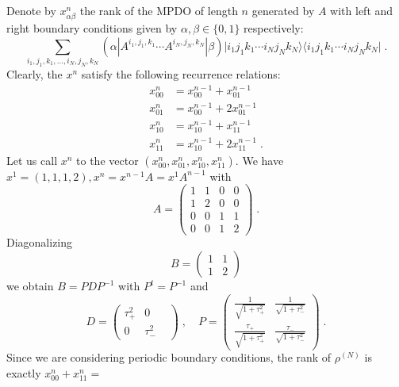 \documentclass{elsarticle}
\newcommand{\be}{\begin{equation}}
\newcommand{\ee}{\end{equation}}
\newcommand{\ket}[1]{\vert#1\rangle}
\newcommand{\bra}[1]{\langle#1\vert}
\begin{document}
Denote by $x^n_{\alpha\beta}$ the rank of the MPDO of length $n$ generated by $A$ with left and right boundary conditions given by $\alpha,\beta\in \{0,1\}$ respectively:
\be
    \sum_{i_1,j_1,k_1,\ldots, i_N,j_N,k_N}(\alpha|A^{i_1,j_1,k_1}\cdots A^{i_N,j_N,k_N}|\beta)\ket{i_1j_1k_1\cdots i_Nj_Nk_N}\bra{i_1j_1k_1\cdots i_Nj_Nk_N}\; .
\ee
Clearly, the $x^n$ satisfy the following recurrence relations:
\begin{align*}
    x^n_{00} & =x^{n-1}_{00}+x^{n-1}_{01}      \\
    x^n_{01} & =x^{n-1}_{00}+2x^{n-1}_{01}     \\
    x^n_{10} & =x^{n-1}_{10}+x^{n-1}_{11}      \\
    x^n_{11} & =x^{n-1}_{10}+2x^{n-1}_{11}\; .
\end{align*}
Let us call $x^n$ to the vector $(x^n_{00},x^n_{01},x^n_{10},x^n_{11})$.
We have
$x^1=(1,1,1,2), x^n= x^{n-1}A=x^1 A^{n-1}$ with $$A=\left(\begin{matrix}
            1 & 1 & 0 & 0 \\
            1 & 2 & 0 & 0 \\
            0 & 0 & 1 & 1 \\
            0 & 0 & 1 & 2
        \end{matrix}\right)\; .$$
Diagonalizing $$B=\left(\begin{matrix}
            1 & 1 \\
            1 & 2
        \end{matrix}\right)$$ we obtain $B=PDP^{-1}$ with $P^t=P^{-1}$ and
$$D=\left(\begin{matrix}
            \tau_+^2 & 0        & \\
            0        & \tau_-^2
        \end{matrix}\right)\; , \quad P= \left(\begin{matrix}
            \frac{1}{\sqrt{1+\tau_+^2}}      & \frac{1}{\sqrt{1+\tau_-^2}}      \\
            \frac{\tau_+}{\sqrt{1+\tau_+^2}} & \frac{\tau_-}{\sqrt{1+\tau_-^2}}
        \end{matrix}\right)\; .$$
Since we are considering periodic boundary conditions, the rank of $\rho^{(N)}$ is exactly $x^n_{00}+x^n_{11}=$
\end{document}
